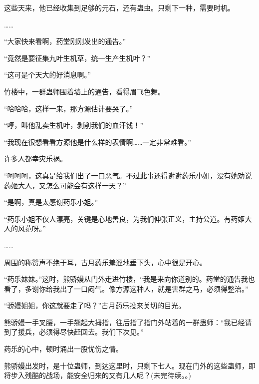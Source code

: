 \begin{this_body}
这些天来，他已经收集到足够的元石，还有蛊虫。只剩下一种，需要时机。

……

“大家快来看啊，药堂刚刚发出的通告。”

“竟然是要征集九叶生机草，统一生产生机叶？”

“这可是个天大的好消息啊。”

竹楼中，一群蛊师围着墙上的通告，看得眉飞色舞。

“哈哈哈，这样一来，那方源估计要哭了。”

“哼，叫他乱卖生机叶，剥削我们的血汗钱！”

“我现在很想看看方源他是什么样的表情啊……一定非常难看。”

许多人都幸灾乐祸。

“呵呵呵，这真是给我们出了一口恶气。不过此事还得谢谢药乐小姐，没有她劝说药姬大人，又怎么可能会有这样一天？”

“是啊，真是太感谢药乐小姐。”

“药乐小姐不仅人漂亮，关键是心地善良，为我们伸张正义，主持公道。有药姬大人的风范呀。”

……

周围的称赞声不绝于耳，古月药乐羞涩地垂下头，心中很是开心。

“药乐妹妹。”这时，熊骄嫚从门外走进竹楼，“我是来向你道别的。药堂的通告我也看了，多谢你给我出了一口闷气。像方源这种人，就是害群之马，必须得整治。”

“骄嫚姐姐，你这就要走了吗？”古月药乐投来关切的目光。

熊骄嫚一手叉腰，一手翘起大拇指，往后指了指门外站着的一群蛊师：“我已经请到了援兵，必须得尽快赶回去。我们下次见。”

药乐的心中，顿时涌出一股忧伤之情。

熊骄嫚出发时，是十位蛊师，到达这里时，只剩下七人。现在门外的这些蛊师，即将步入残酷的战场，能安全归来的又有几人呢？(未完待续。。)

\end{this_body}

